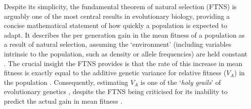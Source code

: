 \documentclass[12pt]{article}
\begin{document}
\begin{bibunit}
Despite its simplicity, the fundamental theorem of natural selection (FTNS) \citep{fisher1930genetical,fisher1958genetical} is arguably one of the most central results in evolutionary biology, providing a concise mathematical statement of how quickly a population is expected to adapt. It describes the per generation gain in the mean fitness of a population as a result of natural selection, assuming the `environment' (including variables intrinsic to the population, such as density or allele frequencies) are held constant \citep{ewens1989interpretation, Frank.1992}. The crucial insight the FTNS provides is that the rate of this increase in mean fitness is exactly equal to the additive genetic variance for relative fitness ($V_A$) in the population \citep{burt1995evolution, grafen2015biological}. Consequently, estimating $V_A$ is one of the `\emph{holy grails}' of evolutionary genetics  \citep{walsh2022full}, despite the FTNS being criticised for its inability to predict the actual gain in mean fitness \citep{price1972fisher, ewens1989interpretation, ewens2024fundamental}. 


\end{bibunit}
\end{document}
